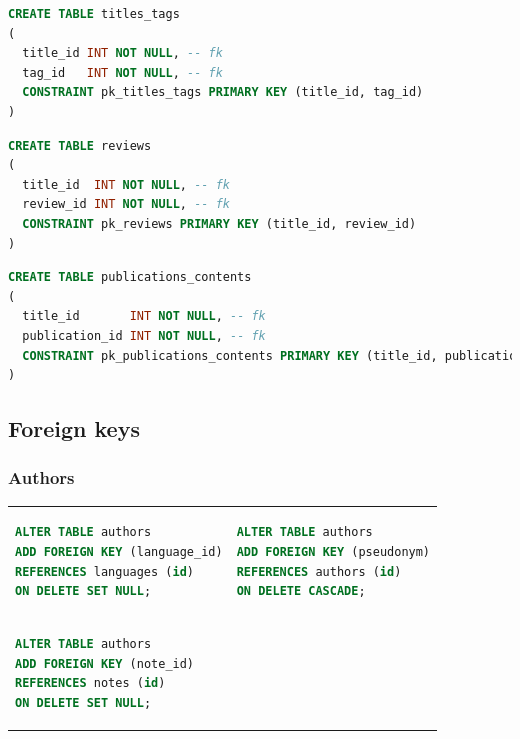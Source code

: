 \documentclass[doubleside, titlepage]{article}
\begin{document}
\begin{lstlisting}[language=SQL,showspaces=false,basicstyle=\ttfamily,numberstyle=\tiny,commentstyle=\color{gray}
        ]
CREATE TABLE titles_tags
(
  title_id INT NOT NULL, -- fk
  tag_id   INT NOT NULL, -- fk
  CONSTRAINT pk_titles_tags PRIMARY KEY (title_id, tag_id)
)
\end{lstlisting}

\begin{lstlisting}[language=SQL,showspaces=false,basicstyle=\ttfamily,numberstyle=\tiny,commentstyle=\color{gray}
        ]
CREATE TABLE reviews
(
  title_id  INT NOT NULL, -- fk
  review_id INT NOT NULL, -- fk
  CONSTRAINT pk_reviews PRIMARY KEY (title_id, review_id)
)
\end{lstlisting}

\begin{lstlisting}[language=SQL,showspaces=false,basicstyle=\ttfamily,numberstyle=\tiny,commentstyle=\color{gray}
        ]
CREATE TABLE publications_contents
(
  title_id       INT NOT NULL, -- fk
  publication_id INT NOT NULL, -- fk
  CONSTRAINT pk_publications_contents PRIMARY KEY (title_id, publication_id)
)
\end{lstlisting}


\subsection{Foreign keys}

\subsubsection{Authors}
\begin{tabular}{ ll }
\begin{minipage}{3in}
\begin{lstlisting}[language=SQL,showspaces=false,basicstyle=\ttfamily,numberstyle=\tiny,commentstyle=\color{gray}
        ]
ALTER TABLE authors
ADD FOREIGN KEY (language_id)
REFERENCES languages (id)
ON DELETE SET NULL;
\end{lstlisting}
\end{minipage}
&
\begin{minipage}{3in}
\begin{lstlisting}[language=SQL,showspaces=false,basicstyle=\ttfamily,numberstyle=\tiny,commentstyle=\color{gray}
        ]
ALTER TABLE authors
ADD FOREIGN KEY (pseudonym)
REFERENCES authors (id)
ON DELETE CASCADE;
\end{lstlisting}
\end{minipage}
\\
\begin{minipage}{3in}
\begin{lstlisting}[language=SQL,showspaces=false,basicstyle=\ttfamily,numberstyle=\tiny,commentstyle=\color{gray}
        ]
ALTER TABLE authors
ADD FOREIGN KEY (note_id)
REFERENCES notes (id)
ON DELETE SET NULL;
\end{lstlisting}

\end{minipage}
\end{tabular}
\end{document}
